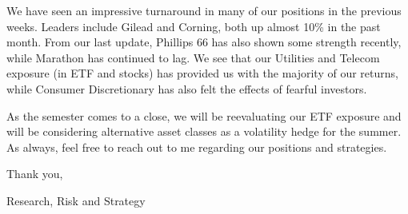 \documentclass[11pt,pressrelease]{newlfm} %
\begin{document}
\begin{newlfm}
\begin{singlespace}
\begin{enumerate}
\end{enumerate}
We have seen an impressive turnaround in many of our positions in the previous weeks.  Leaders include Gilead and Corning, both up almost 10\% in the past month. From our last update, Phillips 66 has also shown some strength recently, while Marathon has continued to lag.  We see that our Utilities and Telecom exposure (in ETF and stocks) has provided us with the majority of our returns, while Consumer Discretionary has also felt the effects of fearful investors. \par As the semester comes to a close, we will be reevaluating our ETF exposure and will be considering alternative asset  classes as a volatility hedge for the summer. As always, feel free to reach out to me regarding our positions and strategies.

Thank you, \par
Research, Risk and Strategy


\end{singlespace} %



\end{newlfm}
\end{document}
